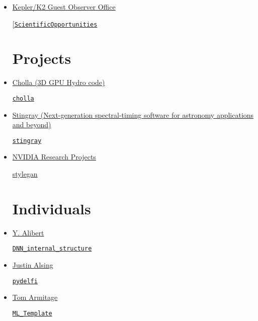 \documentclass[11pt,a4paper]{article}
\begin{document}
\begin{itemize}
\item \href{https://github.com/KeplerGO/}{Kepler/K2 Guest Observer Office}
  \begin{itemize}
    \href{https://github.com/KeplerGO/ScientificOpportunities}{[\tt ScientificOpportunities}
  \end{itemize}
  

\section*{Projects}  
\item \href{https://github.com/cholla-hydro}{Cholla (3D GPU Hydro code)}
  \begin{itemize}
    \href{https://github.com/cholla-hydro/cholla}{{\tt cholla}}
  \end{itemize}

\item \href{https://github.com/StingraySoftware}{Stingray (Next-generation spectral-timing software for astronomy applications and beyond)}
  \begin{itemize}
    \href{https://github.com/StingraySoftware/stingray}{{\tt stingray}}
  \end{itemize}

\item \href{https://github.com/NVlabs}{NVIDIA Research Projects}
\begin{itemize}
\href{https://github.com/NVlabs/stylegan}{stylegan}
\end{itemize}

 

  
\section*{Individuals}  
 
\item \href{https://github.com/yalibert}{Y. Alibert}
  \begin{itemize}
\href{https://github.com/yalibert/DNN_internal_structure}{{\tt DNN\_internal\_structure}}
\end{itemize}

\item \href{https://github.com/justinalsing}{Justin Alsing}
  \begin{itemize}
\href{https://github.com/justinalsing/pydelfi}{{\tt pydelfi}}
\end{itemize}


\item \href{https://github.com/TomArmitage}{Tom Armitage}
  \begin{itemize}
    \href{https://github.com/TomArmitage/ML\_Template}{{\tt ML\_Template}}
  \end{itemize}


\end{itemize}
\end{document}
